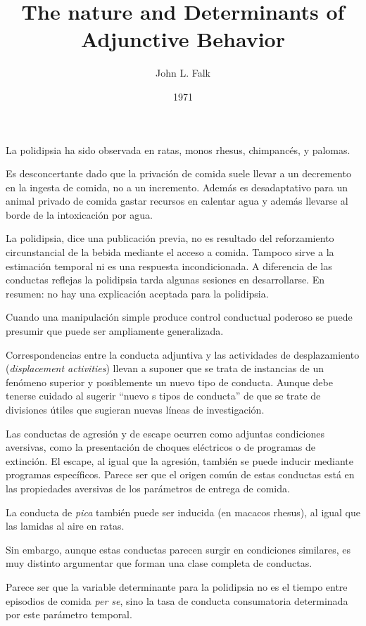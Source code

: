 \documentclass[a4paper,12pt]{article}
\title{The nature and Determinants of Adjunctive Behavior}
\author{John L. Falk}
\date{1971}
\begin{document}
{\scshape\bfseries \maketitle}

La polidipsia ha sido observada en ratas, monos rhesus, chimpancés, y palomas.

Es desconcertante dado que la privación de comida suele llevar a un decremento en la ingesta de comida, no a un incremento. Además es desadaptativo para un animal privado de comida gastar recursos en calentar agua y además llevarse al borde de la intoxicación por agua.

La polidipsia, dice una publicación previa, no es resultado del reforzamiento circunstancial de la bebida mediante el acceso a comida. Tampoco sirve a la estimación temporal ni es una respuesta incondicionada. A diferencia de las conductas reflejas la polidipsia tarda algunas sesiones en desarrollarse. En resumen: no hay una explicación aceptada para la polidipsia.

Cuando una manipulación simple produce control conductual poderoso se puede presumir que puede ser ampliamente generalizada.

Correspondencias entre la conducta adjuntiva y las actividades de desplazamiento ({\itshape displacement activities}) llevan a suponer que se trata de instancias de un fenómeno superior y posiblemente un nuevo tipo de conducta. Aunque debe tenerse cuidado al sugerir ``nuevo s tipos de conducta'' de que se trate de divisiones útiles que sugieran nuevas líneas de investigación.

Las conductas de agresión y de escape ocurren como adjuntas condiciones aversivas, como la presentación de choques eléctricos o de programas de extinción. El escape, al igual que la agresión, también se puede inducir mediante programas específicos. Parece ser que el origen común de estas conductas está en las propiedades aversivas de los parámetros de entrega de comida.

La conducta de {\itshape pica} también puede ser inducida (en macacos rhesus), al igual que las lamidas al aire en ratas.

Sin embargo, aunque estas conductas parecen surgir en condiciones similares, es muy distinto argumentar que forman una clase completa de conductas.

Parece ser que la variable determinante para la polidipsia no es el tiempo entre episodios de comida {\itshape per se}, sino la tasa de conducta consumatoria determinada por este parámetro temporal.
\end{document}
